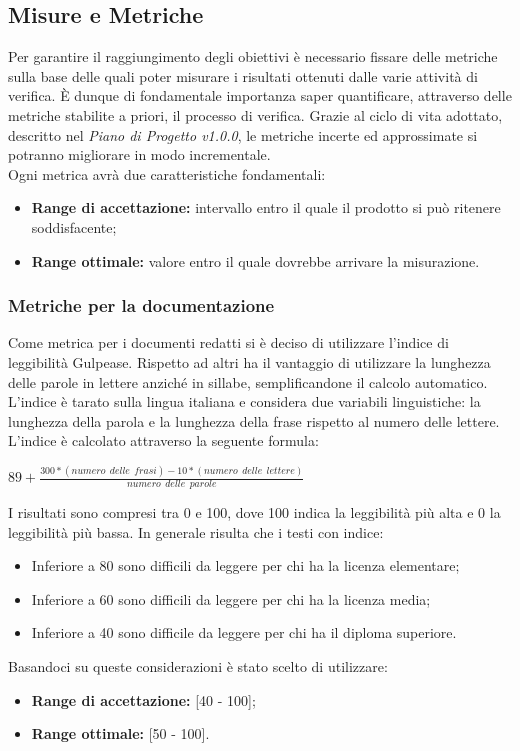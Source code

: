 \subsection{Misure e Metriche}
Per garantire il raggiungimento degli obiettivi è necessario fissare delle metriche sulla base delle quali poter misurare i risultati ottenuti dalle varie attività di verifica. È dunque di fondamentale importanza saper quantificare, attraverso delle metriche stabilite a priori, il processo di verifica. Grazie al ciclo di vita adottato, descritto nel \textit{Piano di Progetto v1.0.0}, le metriche incerte ed approssimate si potranno migliorare in modo incrementale.\\
Ogni metrica avrà due caratteristiche fondamentali:
\begin{itemize}
	\item \textbf{Range di accettazione:} intervallo entro il quale il prodotto si può ritenere soddisfacente;
	\item \textbf{Range ottimale:} valore entro il quale dovrebbe arrivare la misurazione.
\end{itemize} 
	\subsubsection{Metriche per la documentazione}
	Come metrica per i documenti redatti si è deciso di utilizzare l'indice di leggibilità Gulpease. Rispetto ad altri ha il vantaggio di utilizzare la lunghezza delle parole in lettere anziché in sillabe, semplificandone il calcolo automatico. L'indice è tarato sulla lingua italiana e considera due variabili linguistiche: la lunghezza della parola e la lunghezza della frase rispetto al numero delle lettere. \\
	L'indice è calcolato attraverso la seguente formula:\\
	\begin{center}
	$89+ \frac{300*\left(numero\:\ delle\:\ frasi \right)-10*\left(numero\:\ delle\:\ lettere\right)}{numero\:\ delle\:\ parole}$
	\end{center}
	I risultati sono compresi tra 0 e 100, dove 100 indica la leggibilità più alta e 0 la leggibilità più bassa. In generale risulta che i testi con indice:
	\begin{itemize}
		\item Inferiore a 80 sono difficili da leggere per chi ha la licenza elementare;
		\item Inferiore a 60 sono difficili da leggere per chi ha la licenza media;
		\item Inferiore a 40 sono difficile da leggere per chi ha il diploma superiore.
	\end{itemize}
	Basandoci su queste considerazioni è stato scelto di utilizzare:
	\begin{itemize}
		\item \textbf{Range di accettazione:} [40 - 100];
		\item \textbf{Range ottimale:} [50 - 100].
	\end{itemize}
	
